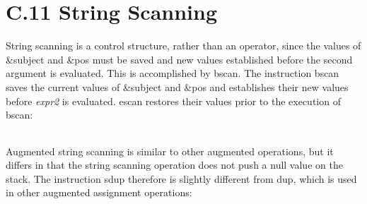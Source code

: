 \begin{center}
\begin{supertabular}{|m{1.9073598in}|m{2.75596in}|}
\end{supertabular}
\end{center}


\section{C.11 String Scanning}

String scanning is a control structure, rather than an operator, since
the values of \&subject and \&pos must be saved and new values
established before the second argument is evaluated. This is
accomplished by bscan. The instruction bscan saves the current values
of \&subject and \&pos and establishes their new values before
\textit{expr2} is evaluated. escan restores their values prior to the
execution of bscan:

\begin{center}
\tabletail{}
\tablelasttail{}
\begin{supertabular}{|m{1.9073598in}|m{2.75596in}|}

\end{supertabular}
\end{center}

Augmented string scanning is similar to other augmented operations,
but it differs in that the string scanning operation does not push a
null value on the stack. The instruction sdup therefore is slightly
different from dup, which is used in other augmented assignment
operations:

